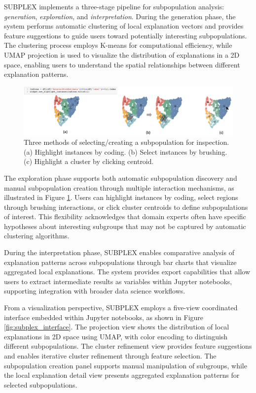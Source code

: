 SUBPLEX implements a three-stage pipeline for subpopulation analysis: \textit{generation}, \textit{exploration}, and \textit{interpretation}. During the generation phase, the system performs automatic clustering of local explanation vectors and provides feature suggestions to guide users toward potentially interesting subpopulations. The clustering process employs K-means for computational efficiency, while UMAP projection is used to visualize the distribution of explanations in a 2D space, enabling users to understand the spatial relationships between different explanation patterns.

\begin{figure}[htbp]
\centering
\includegraphics[width=\textwidth]{images/subplex2.png}
\caption{Three methods of selecting/creating a subpopulation for inspection. (a) Highlight instances by coding. (b) Select
instances by brushing. (c) Highlight a cluster by clicking centroid.}
\label{fig:subplex_interactions}
\end{figure}

The exploration phase supports both automatic subpopulation discovery and manual subpopulation creation through multiple interaction mechanisms, as illustrated in Figure \ref{fig:subplex_interactions}. Users can highlight instances by coding, select regions through brushing interactions, or click cluster centroids to define subpopulations of interest. This flexibility acknowledges that domain experts often have specific hypotheses about interesting subgroups that may not be captured by automatic clustering algorithms.

During the interpretation phase, SUBPLEX enables comparative analysis of explanation patterns across subpopulations through bar charts that visualize aggregated local explanations. The system provides export capabilities that allow users to extract intermediate results as variables within Jupyter notebooks, supporting integration with broader data science workflows.

From a visualization perspective, SUBPLEX employs a five-view coordinated interface embedded within Jupyter notebooks, as shown in Figure \ref{fig:subplex_interface}. The projection view shows the distribution of local explanations in 2D space using UMAP, with color encoding to distinguish different subpopulations. The cluster refinement view provides feature suggestions and enables iterative cluster refinement through feature selection. The subpopulation creation panel supports manual manipulation of subgroups, while the local explanation detail view presents aggregated explanation patterns for selected subpopulations.

